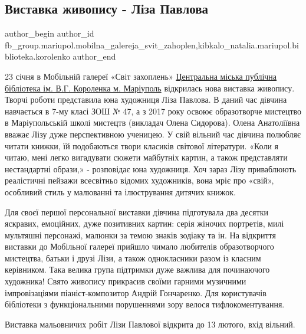  
 
 
 
 

\subsection{Виставка живопису - Ліза Павлова}
\label{sec:23_01_2022.fb.fb_group.mariupol.mobilna_galereja_svit_zahoplen.1.vistavka_zhivopisu__}
 
\ifcmt
 author_begin
   author_id fb_group.mariupol.mobilna_galereja_svit_zahoplen,kibkalo_natalia.mariupol.biblioteka.korolenko
 author_end
\fi

23 січня в Мобільній галереї «Світ захоплень» \href{https://www.facebook.com/groups/1476321979131170}{Центральна міська публічна
бібліотека ім. В.Г. Короленка м. Маріуполь} відкрилась нова виставка живопису.
Творчі роботи представила юна художниця Ліза Павлова. В даний час дівчина
навчається в 7-му класі ЗОШ № 47, а з 2017 року освоює образотворче мистецтво в
Маріупольській школі мистецтв (викладач Олена Сидорова).  Олена Анатоліївна
вважає Лізу дуже перспективною ученицею. У свій вільний час дівчина полюбляє
читати книжки, їй подобаються твори класиків світової літератури. «Коли я
читаю, мені легко вигадувати сюжети майбутніх картин, а також представляти
нестандартні образи,» - розповідає юна художниця. Хоч зараз Лізу приваблюють
реалістичні пейзажи всесвітньо відомих художників, вона мріє про «свій»,
особливий стиль у малюванні та ілюстрування дитячих книжок.

Для своєї першої персональної виставки дівчина підготувала два десятки
яскравих, емоційних, дуже позитивних картин: серія жіночих портретів, милі
мультяшні персонажі, малюнки за темою знаків зодіаку та ін. На відкриття
виставки до Мобільної галереї прийшло чимало любителів образотворчого
мистецтва, батьки і друзі Лізи, а також однокласники разом із класним
керівником. Така велика група підтримки дуже важлива для починаючого художника!
Свято живопису прикрасив своїми гарними музичними імпровізаціями
піаніст-композитор Андрій Гончаренко. Для користувачів бібліотеки з
функціональними порушеннями зору велося тифлокоментування.

Виставка мальовничих робіт Лізи Павлової відкрита до 13 лютого, вхід вільний.
